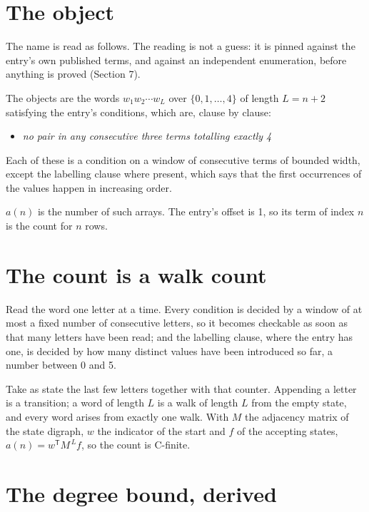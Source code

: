 \documentclass[11pt]{article}
\theoremstyle{definition}
\begin{document}
\section{The object}

The name is read as follows. The reading is not a guess: it is pinned against the entry's own published terms, and against an independent enumeration, before anything is proved (Section 7).

The objects are the words $w_1 w_2 \cdots w_L$ over $\{0,1,\dots,4\}$ of length $L = n + 2$ satisfying the entry's conditions, which are, clause by clause:

\begin{itemize}

\item {\itshape no pair in any consecutive three terms totalling exactly 4}

\end{itemize}

Each of these is a condition on a window of consecutive terms of bounded width, except the labelling clause where present, which says that the first occurrences of the values happen in increasing order.

$a(n)$ is the number of such arrays. The entry's offset is 1, so its term of index $n$ is the count for $n$ rows.

\section{The count is a walk count}

Read the word one letter at a time. Every condition is decided by a window of at most a fixed number of consecutive letters, so it becomes checkable as soon as that many letters have been read; and the labelling clause, where the entry has one, is decided by how many distinct values have been introduced so far, a number between $0$ and 5.

Take as state the last few letters together with that counter. Appending a letter is a transition; a word of length $L$ is a walk of length $L$ from the empty state, and every word arises from exactly one walk. With $M$ the adjacency matrix of the state digraph, $w$ the indicator of the start and $f$ of the accepting states, $a(n) = w^{\mathsf T}M^{\,L}f$, so the count is C-finite.

\section{The degree bound, derived}
\end{document}
